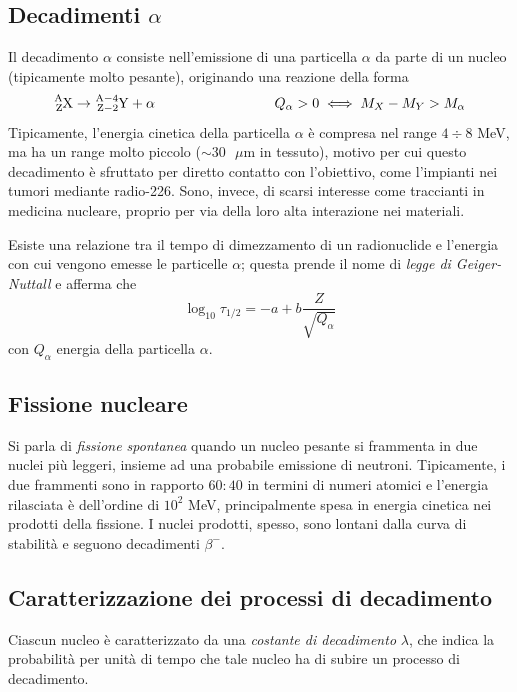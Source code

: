 \documentclass[11pt, a4paper]{scrartcl}
\theoremstyle{style}
\theoremstyle{style1}
\numberwithin{equation}{subsection}
\begin{document}
\subsection{Decadimenti $\alpha $}
Il decadimento $\alpha $ consiste nell'emissione di una particella $\alpha $ da parte di un nucleo (tipicamente molto pesante), originando una reazione della forma
\begin{equation}
	\ce{^A_ZX}\to \ce{^{A-4}_{Z-2}Y + \alpha} \hspace{3cm} Q_\alpha > 0 \iff M_X - M_Y > M_\alpha 
\end{equation}
Tipicamente, l'energia cinetica della particella $\alpha $ \`e compresa nel range $4 \div 8$ MeV, ma ha un range molto piccolo ($\sim 30 \text{ } \mu \text{m}$ in tessuto), motivo per cui questo decadimento \`e sfruttato per diretto contatto con l'obiettivo, come l'impianti nei tumori mediante radio-226.
Sono, invece, di scarsi interesse come traccianti in medicina nucleare, proprio per via della loro alta interazione nei materiali.

Esiste una relazione tra il tempo di dimezzamento di un radionuclide e l'energia con cui vengono emesse le particelle $\alpha $; questa prende il nome di \textit{legge di Geiger-Nuttall} e afferma che
\begin{equation}
	\log_{10} \tau _{1 / 2} = -a + b \frac{Z}{\sqrt{Q_\alpha } }
\end{equation}
con $Q_\alpha $ energia della particella $\alpha $.

\subsection{Fissione nucleare}
Si parla di \textit{fissione spontanea} quando un nucleo pesante si frammenta in due nuclei pi\`u leggeri, insieme ad una probabile emissione di neutroni. 
Tipicamente, i due frammenti sono in rapporto $60:40$ in termini di numeri atomici e l'energia rilasciata \`e dell'ordine di $10^2$ MeV, principalmente spesa in energia cinetica nei prodotti della fissione.
I nuclei prodotti, spesso, sono lontani dalla curva di stabilit\`a e seguono decadimenti $\beta ^-$.

\subsection{Caratterizzazione dei processi di decadimento}

Ciascun nucleo \`e caratterizzato da una \textit{costante di decadimento} $\lambda $, che indica la probabilit\`a per unit\`a di tempo che tale nucleo ha di subire un processo di decadimento.
\end{document}

